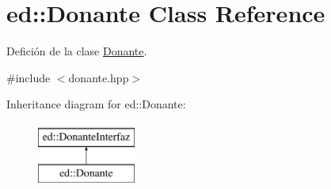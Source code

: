 \hypertarget{classed_1_1Donante}{\section{ed\-:\-:Donante Class Reference}
\label{classed_1_1Donante}
}


Defición de la clase \hyperlink{classed_1_1Donante}{Donante}.  




{\ttfamily \#include $<$donante.\-hpp$>$}

Inheritance diagram for ed\-:\-:Donante\-:\begin{figure}[H]
\begin{center}
\leavevmode
\includegraphics[height=2.000000cm]{classed_1_1Donante}
\end{center}
\end{figure}
